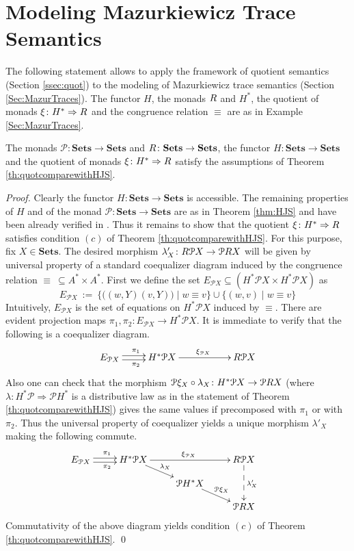 \documentclass[oribibl,envcountsame,envcountsect,runningheads]{llncs}
\newcommand{\Pow}{\mathcal{P}}
\newcommand{\Cat}[1]{\ensuremath{\mathbf{#1}}}
\newcommand{\Sets}{\Cat{Sets}}
\newcommand{\free}[1]{{#1^*}}
\renewcommand{\>}{\rangle}
\def\To{\Rightarrow}
\def\:{\colon}
\begin{document}
\section{Modeling Mazurkiewicz Trace Semantics}\label{app:mazurAss}

 The following statement allows to apply the framework of quotient semantics (Section \ref{ssec:quot}) to the modeling of Mazurkiewicz trace semantics (Section \ref{Sec:MazurTraces}). The functor $H$, the monads $R$ and $\free{H}$, the quotient of monads $\quot \: \free{H} \To \MM$ and the congruence relation $\equiv$ are as in Example \ref{Sec:MazurTraces}.

\begin{proposition}The monads $\Pow \: \Sets \to \Sets$ and $\MM \: \Sets \to \Sets$, the functor $H\: \Sets \to \Sets$ and the quotient of monads  $\quot \: \free{H} \To \MM$ satisfy the assumptions of Theorem \ref{th:quotcomparewithHJS}.
\end{proposition}
\begin{proof}
Clearly the functor $H \: \Sets \to \Sets$ is accessible. The remaining properties of $H$ and of the monad $\Pow \: \Sets \to \Sets$ are as in Theorem \ref{thm:HJS} and have been already verified in \cite{HasuoJS:07}. Thus it remains to show that the quotient $\quot \: \free{H} \To \MM$ satisfies condition $(c)$ of Theorem \ref{th:quotcomparewithHJS}. For this purpose, fix $X \in \Sets$. The desired morphism $\lambda'_X \: \MM\Pow X \to \Pow \MM X$ will be given by universal property of a standard coequalizer diagram induced by the congruence relation $\equiv\ \subseteq {A^* \times A^*}$. First we define the set $E_{\Pow X} \subseteq (\free{H}\Pow X \times \free{H}\Pow X)$ as
\[ E_{\Pow X} \ :=\ \{\big( (w, Y) (v,Y)\big) \mid w \equiv v\} \cup \{(w, v) \mid w \equiv v\}\]
Intuitively, $E_{\Pow X}$ is the set of equations on $\free{H}\Pow X$ induced by $\equiv$. There are evident projection maps $\pi_1,\pi_2 \: E_{\Pow X} \to \free{H} \Pow X$. It is immediate to verify that the following is a coequalizer diagram.
\[\xymatrix{
E_{\Pow X} \ar@<.5ex>[r]^{\pi_1} \ar@<-.5ex>[r]_{\pi_2} &
\free{H} \Pow X \ar[rr]^{{\quot}_{\Pow X}} &&
\MM \Pow X
}
\]
Also one can check that the morphism $\Pow {\quot}_X \circ \lambda_X \: \free{H} \Pow X \to \Pow \MM X$ (where $\lambda \: \free{H} \Pow \To \Pow \free{H}$ is a distributive law as in the statement of Theorem \ref{th:quotcomparewithHJS}) gives the same values if precomposed with $\pi_1$ or with $\pi_2$. Thus the universal property of coequalizer yields a unique morphism $\lambda'_X$ making the following commute.
\[\xymatrix@R=.4cm{
E_{\Pow X} \ar@<.5ex>[r]^{\pi_1} \ar@<-.5ex>[r]_{\pi_2} &
\free{H} \Pow X \ar[rr]^{{\quot}_{\Pow X}} \ar[dr]^{\lambda_X} &&
\MM \Pow X \ar@{-->}[dd]^{\lambda'_X} \\
&& \Pow \free{H} X \ar[dr]^{\Pow {\quot}_X}&& \\
& && \Pow \MM X
}
\]
Commutativity of the above diagram yields condition $(c)$ of Theorem \ref{th:quotcomparewithHJS}. \qed
\end{proof} 

 
\end{document}
